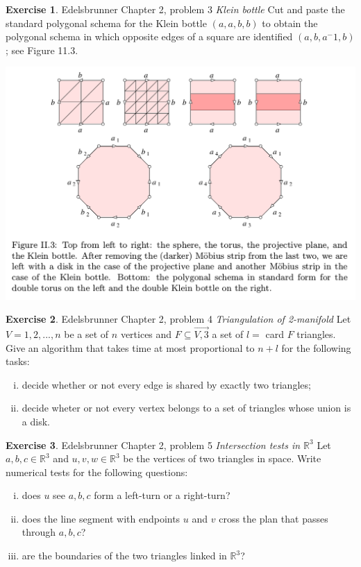 \documentclass[12pt]{article}
\theoremstyle{definition}
\newtheorem{exercise}{Exercise}
\begin{document}
\begin{exercise} Edelsbrunner Chapter 2, problem 3 \textit{Klein bottle}\newline 
	Cut and paste the standard polygonal schema for the Klein bottle $(a,a,b,b)$ to obtain the polygonal schema in which opposite edges of a square are identified $(a,b,a^-1,b)$; see Figure 11.3.\begin{center}\includegraphics[scale=0.4]{FigureII-3}\end{center}
\end{exercise}

\begin{exercise} Edelsbrunner Chapter 2, problem 4 \textit{Triangulation of 2-manifold}\newline
	Let $V={1,2,...,n}$ be a set of $n$ vertices and $F\subseteq\vec{V,3}$ a set of $l=$ card $F$ triangles. Give an algorithm that takes time at most proportional to $n+l$ for the following tasks:
	\begin{enumerate}[(i)]
		\item decide whether or not every edge is shared by exactly two triangles;
		\item decide wheter or not every vertex belongs to a set of triangles whose union is a disk.
	\end{enumerate}
\end{exercise}

\begin{exercise} Edelsbrunner Chapter 2, problem 5 \textit{Intersection tests in $\mathbb{R}^3$}\newline
	Let $a,b,c\in\mathbb{R}^3$ and $u,v,w\in\mathbb{R}^3$ be the vertices of two triangles in space. Write numerical tests for the following questions:
	\begin{enumerate}[(i)]
		\item does $u$ see $a,b,c$ form a left-turn or a right-turn?
		\item does the line segment with endpoints $u$ and $v$ cross the plan that passes through $a,b,c$?
		\item are the boundaries of the two triangles linked in $\mathbb{R}^3$?
	\end{enumerate}
\end{exercise}
\end{document}
